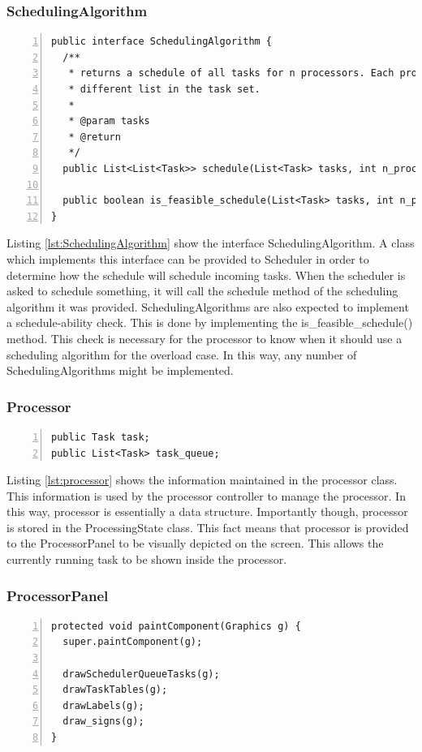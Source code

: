\documentclass{article} %
\begin{document}
\subsubsection{SchedulingAlgorithm}
\begin{lstlisting}[caption={Scheduling Algorithm interface},label={lst:SchedulingAlgorithm},numbers=left]
public interface SchedulingAlgorithm {
  /**
   * returns a schedule of all tasks for n processors. Each processor has a
   * different list in the task set.
   * 
   * @param tasks
   * @return
   */
  public List<List<Task>> schedule(List<Task> tasks, int n_processors);

  public boolean is_feasible_schedule(List<Task> tasks, int n_processors);
}
\end{lstlisting}

Listing \ref{lst:SchedulingAlgorithm} show the interface SchedulingAlgorithm.
A class which implements this interface can be provided to Scheduler in order to determine how the schedule will schedule incoming tasks.
When the scheduler is asked to schedule something, it will call the schedule method of the scheduling algorithm it was provided.
SchedulingAlgorithms are also expected to implement a schedule-ability check.
This is done by implementing the is\_feasible\_schedule() method. This check is necessary for the processor to know when it should use a scheduling algorithm for the overload case.
In this way, any number of SchedulingAlgorithms might be implemented.

\subsubsection{Processor}
\begin{lstlisting}[caption={Values maintained in Processor},label={lst:processor},numbers=left]
public Task task;
public List<Task> task_queue;
\end{lstlisting}

Listing \ref{lst:processor} shows the information maintained in the processor class.
This information is used by the processor controller to manage the processor.
In this way, processor is essentially a data structure.
Importantly though, processor is stored in the ProcessingState class.
This fact means that processor is provided to the ProcessorPanel to be visually depicted on the screen.
This allows the currently running task to be shown inside the processor.

\subsubsection{ProcessorPanel}
\begin{lstlisting}[caption={Update process of ProcessorPanel},label={lst:ProcessorPanel},numbers=left]
protected void paintComponent(Graphics g) {
  super.paintComponent(g);

  drawSchedulerQueueTasks(g);
  drawTaskTables(g);
  drawLabels(g);
  draw_signs(g);
}
\end{lstlisting}
\end{document}
